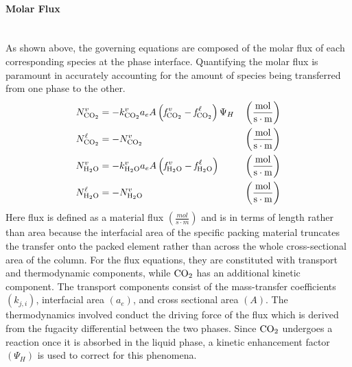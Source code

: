 \documentclass[a4paper,fleqn]{cas-sc}
\newcommand{\COtwo}{{\ce{CO2}}}
\newcommand{\HtwoO}{{\ce{H2O}}}
\newcommand{\liq}{\ell}
\newcommand{\vap}{v}
\begin{document}
    \paragraph{Molar Flux}\mbox{}\\[0.5em]
    As shown above, the governing equations are composed of the molar flux of each corresponding species at the phase interface. Quantifying the molar flux is paramount in accurately accounting for the amount of species being transferred from one phase to the other.
    \begin{align}
        N^{\vap}_{ \COtwo} &=  -k^{\vap}_{ \COtwo}  a_e A  \left(\textit{f}^{\:\vap}_{ \COtwo} - \textit{f}^{\:\liq}_{ \COtwo}\right) \Psi _{H} && \left(\frac{\unit{mol}}{\unit{s\cdot m}} \right) \\
        N^{\liq}_{ \COtwo} &= -N^{\vap}_{ \COtwo} && \left(\frac{\unit{mol}}{\unit{s\cdot m}} \right) \\
        N^{\vap}_{ \HtwoO} &= -k^{\vap}_{ \HtwoO} a_e A \left(\textit{f}^{\:\vap}_{ \HtwoO} - \textit{f}^{\:\liq}_{ \HtwoO}\right)  && \left(\frac{\unit{mol}}{\unit{s\cdot m}} \right) \\
        N^{\liq}_{ \HtwoO} &= -N^{\vap}_{ \HtwoO} && \left(\frac{\unit{mol}}{\unit{s\cdot m}} \right)
    \end{align}
    Here flux is defined as a material flux $\left(\frac{\unit{mol}}{\unit{s\cdot m}} \right)$ and is in terms of length rather than area because the interfacial area of the specific packing material truncates the transfer onto the packed element rather than across the whole cross-sectional area of the column. For the flux equations, they are constituted with transport and thermodynamic components, while $\COtwo$ has an additional kinetic component. The transport components consist of the mass-transfer coefficients $\left(k_{j, i} \right)$, interfacial area $\left(a_e\right)$, and cross sectional area $\left(A\right)$. The thermodynamics involved conduct the driving force of the flux which is derived from the fugacity differential between the two phases. Since $\COtwo$ undergoes a reaction once it is absorbed in the liquid phase, a kinetic enhancement factor $\left(\Psi _{H}\right)$ is used to correct for this phenomena.
\end{document}
